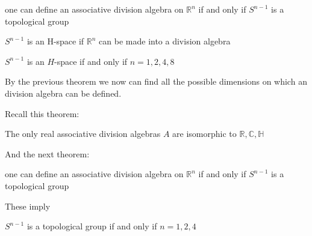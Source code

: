 \documentclass{beamer}
\begin{document}
\begin{frame}
\begin{theorem}
one can define an associative division algebra on $\mathbb{R}^n$ if and only if $S^{n-1}$ is a topological group
\end{theorem}
\pause
\begin{theorem}
$S^{n-1}$ is an H-space if $\mathbb{R}^n$ can be made into a division algebra
\end{theorem}
\end{frame}

\begin{frame}

\begin{theorem}
$S^{n-1}$ is an $H$-space if and only if $n = 1,2,4,8$
\end{theorem}

\pause
By the previous theorem we now can find all the possible dimensions on which an division algebra can be defined.

\end{frame}

\begin{frame}
Recall this theorem:
\begin{theorem}
The only real associative division algebras $A$ are isomorphic to $\mathbb{R}, \mathbb{C},\mathbb{H}$
\end{theorem}
\pause
And the next theorem:
\begin{theorem}
one can define an associative division algebra on $\mathbb{R}^n$ if and only if $S^{n-1}$ is a topological group
\end{theorem}
\pause
These imply
\begin{theorem}

$S^{n-1}$ is a topological group if and only if $n = 1,2,4$
\end{theorem}
\end{frame}
\end{document}
